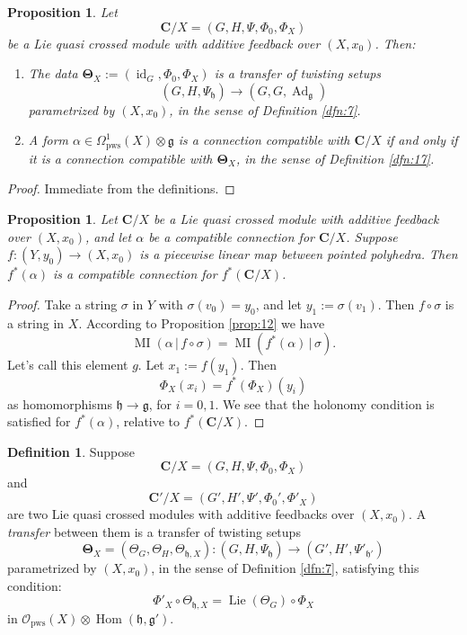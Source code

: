 \documentclass[10pt, a4paper]{amsart}
\newtheorem{prop}[equation]{Proposition}
\theoremstyle{definition}
\newtheorem{dfn}[equation]{Definition}
\numberwithin{equation}{section}
\newcommand{\opn}{\operatorname}
\newcommand{\mfrak}[1]{\mathfrak{#1}}
\newcommand{\mcal}[1]{\mathcal{#1}}
\newcommand{\mbf}[1]{\mathbf{#1}}
\newcommand{\mrm}[1]{\mathrm{#1}}
\newcommand{\tup}[1]{\textup{#1}}
\newcommand{\bsym}[1]{\boldsymbol{#1}}
\renewcommand{\vert}{\, | \,}
\newcommand{\g}{\mfrak{g}}
\newcommand{\h}{\mfrak{h}}
\begin{document}
\begin{prop} \label{prop:9}
Let  
\[ \mbf{C} / X = (G, H, \Psi, \Phi_0, \Phi_X) \]
be a Lie quasi crossed module with additive feedback
over $(X, x_0)$. Then:
\begin{enumerate}
\item The data $\bsym{\Theta}_X := (\opn{id}_G, \Phi_0, \Phi_X)$ is a
transfer of twisting setups
\[  (G, H, \Psi_{\h}) \to (G, G, \opn{Ad}_{\g}) \]
parametrized by $(X, x_0)$, in the sense of Definition 
\tup{\ref{dfn:7}}.

\item A form
$\alpha \in \Omega_{\mrm{pws}}^1(X) \otimes \g$
is a connection compatible with $\mbf{C} / X$ if and only if it is a 
connection compatible with $\bsym{\Theta}_X$, in the sense of 
Definition \tup{\ref{dfn:17}}.
\end{enumerate}
\end{prop}

\begin{proof}
Immediate from the definitions.
\end{proof}

\begin{prop} \label{prop:15}
Let $\mbf{C} / X$ be a Lie quasi crossed module with additive feedback over
$(X, x_0)$, and let $\alpha$ be a compatible connection for $\mbf{C} / X$. 
Suppose $f : (Y, y_0) \to (X, x_0)$ is a piecewise linear map between pointed
polyhedra. Then $f^*(\alpha)$ is a compatible connection for
$f^* (\mbf{C} / X)$.
\end{prop}

\begin{proof}
Take a string $\sigma$ in $Y$ with $\sigma(v_0) = y_0$, and let
$y_1 := \sigma(v_1)$. Then $f \circ \sigma$ is a string in $X$. According to
Proposition \ref{prop:12} we have 
\[ \opn{MI}(\alpha \vert f \circ \sigma) = 
\opn{MI}( f^*(\alpha) \vert \sigma)  . \]
Let's call this element $g$. Let $x_1 := f(y_1)$. Then 
\[ \Phi_X(x_i) = f^*(\Phi_X)(y_i) \] 
as homomorphisms $\h \to \g$, for $i = 0, 1$. 
We see that the holonomy condition is satisfied for 
$f^*(\alpha)$, relative to $f^* (\mbf{C} / X)$.
\end{proof}

\begin{dfn} \label{dfn:18}
Suppose 
\[ \mbf{C} / X = (G, H, \Psi, \Phi_0, \Phi_X) \] 
and 
\[ \mbf{C}' / X = (G', H', \Psi', \Phi_0', \Phi'_X) \]
are two Lie quasi crossed
modules with additive feedbacks over $(X, x_0)$. 
A {\em transfer} between them is a transfer of twisting setups
\[ \bsym{\Theta}_X = (\Theta_G, \Theta_H, \Theta_{\h, X}) :
(G, H, \Psi_{\h}) \to (G', H', \Psi'_{\h'})  \]
parametrized by $(X, x_0)$,
in the sense of Definition \ref{dfn:7}, satisfying this condition:
\[ \Phi'_X \circ \Theta_{\h, X} = \opn{Lie}(\Theta_G) \circ \Phi_X \]
in 
$\mcal{O}_{\mrm{pws}}(X) \otimes \opn{Hom}(\h, \g')$.
\end{dfn}
\end{document}
